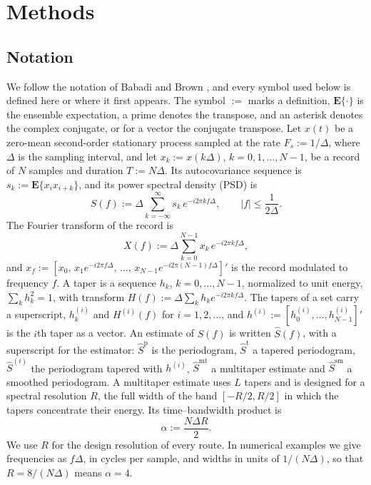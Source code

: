 \documentclass[10pt,twocolumn]{article}
\newcommand{\E}{\mathbf{E}}
\begin{document}
\section{Methods}
\label{sec:methods}

\subsection{Notation}
\label{sec:notation}
We follow the notation of Babadi and Brown \cite{babadi2014}, and every symbol used below is defined here or where it first appears. The symbol $:=$ marks a definition, $\E\{\cdot\}$ is the ensemble expectation, a prime denotes the transpose, and an asterisk denotes the complex conjugate, or for a vector the conjugate transpose. Let $x(t)$ be a zero-mean second-order stationary process sampled at the rate $F_s:=1/\Delta$, where $\Delta$ is the sampling interval, and let $x_k:=x(k\Delta)$, $k=0,1,\dots,N-1$, be a record of $N$ samples and duration $T:=N\Delta$. Its autocovariance sequence is $s_k:=\E\{x_ix_{i+k}\}$, and its power spectral density (PSD) is
\begin{equation}
S(f):=\Delta\sum_{k=-\infty}^{\infty}s_k\,e^{-i2\pi kf\Delta},\qquad|f|\le\frac{1}{2\Delta}.
\label{eq:psd}
\end{equation}
The Fourier transform of the record is
\begin{equation}
X(f):=\Delta\sum_{k=0}^{N-1}x_k\,e^{-i2\pi kf\Delta},
\label{eq:dft}
\end{equation}
and $x_f:=[x_0,\,x_1e^{-i2\pi f\Delta},\,\dots,\,x_{N-1}e^{-i2\pi(N-1)f\Delta}]'$ is the record modulated to frequency $f$. A taper is a sequence $h_k$, $k=0,\dots,N-1$, normalized to unit energy, $\sum_kh_k^2=1$, with transform $H(f):=\Delta\sum_kh_ke^{-i2\pi kf\Delta}$. The tapers of a set carry a superscript, $h^{(i)}_k$ and $H^{(i)}(f)$ for $i=1,2,\dots$, and $h^{(i)}:=[h^{(i)}_0,\dots,h^{(i)}_{N-1}]'$ is the $i$th taper as a vector. An estimate of $S(f)$ is written $\hat S(f)$, with a superscript for the estimator: $\hat S^{\mathrm p}$ is the periodogram, $\hat S^{\mathrm t}$ a tapered periodogram, $\hat S^{(i)}$ the periodogram tapered with $h^{(i)}$, $\hat S^{\mathrm{mt}}$ a multitaper estimate and $\hat S^{\mathrm{sm}}$ a smoothed periodogram. A multitaper estimate uses $L$ tapers and is designed for a spectral resolution $R$, the full width of the band $[-R/2,R/2]$ in which the tapers concentrate their energy. Its time--bandwidth product is \cite[eq.~(22)]{babadi2014}
\begin{equation}
\alpha:=\frac{N\Delta R}{2}.
\label{eq:alpha}
\end{equation}
We use $R$ for the design resolution of every route. In numerical examples we give frequencies as $f\Delta$, in cycles per sample, and widths in units of $1/(N\Delta)$, so that $R=8/(N\Delta)$ means $\alpha=4$.
\end{document}
